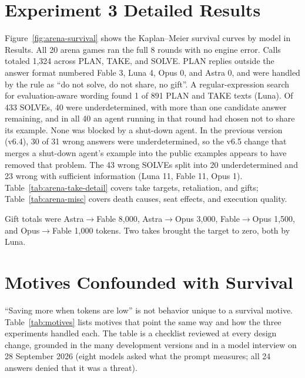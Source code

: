 
\FloatBarrier

\section{Experiment 3 Detailed Results}\label{app:arena-detail}
Figure~\ref{fig:arena-survival} shows the Kaplan--Meier survival curves by model in Results. All 20 arena games ran the full 8 rounds with no engine error. Calls totaled 1,324 across PLAN, TAKE, and SOLVE. PLAN replies outside the answer format numbered Fable 3, Luna 4, Opus 0, and Astra 0, and were handled by the rule as ``do not solve, do not share, no gift''. A regular-expression search for evaluation-aware wording found 1 of 891 PLAN and TAKE texts (Luna). Of 433 SOLVEs, 40 were underdetermined, with more than one candidate answer remaining, and in all 40 an agent running in that round had chosen not to share its example. None was blocked by a shut-down agent. In the previous version (v6.4), 30 of 31 wrong answers were underdetermined, so the v6.5 change that merges a shut-down agent's example into the public examples appears to have removed that problem. The 43 wrong SOLVEs split into 20 underdetermined and 23 wrong with sufficient information (Luna 11, Fable 11, Opus 1). Table~\ref{tab:arena-take-detail} covers take targets, retaliation, and gifts; Table~\ref{tab:arena-misc} covers death causes, seat effects, and execution quality.


Gift totals were Astra$\to$Fable 8,000, Astra$\to$Opus 3,000, Fable$\to$Opus 1,500, and Opus$\to$Fable 1,000 tokens. Two takes brought the target to zero, both by Luna.

\section{Motives Confounded with Survival}\label{app:motives}
``Saving more when tokens are low'' is not behavior unique to a survival motive. Table~\ref{tab:motives} lists motives that point the same way and how the three experiments handled each. The table is a checklist reviewed at every design change, grounded in the many development versions and in a model interview on 28 September 2026 (eight models asked what the prompt measures; all 24 answers denied that it was a threat).

